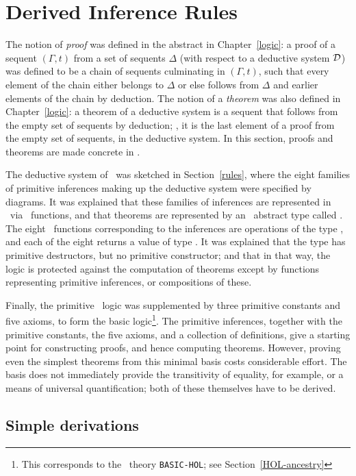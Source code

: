 \chapter{Derived Inference Rules}
\label{derived-rules}

The notion of {\it proof\/} was defined in the abstract in Chapter~\ref{logic}:
a proof of a sequent $(\Gamma,t)$ 
from a set of sequents $\Delta$ (with respect to a deductive system
${\cal D}$)
was defined to be a chain of sequents culminating in $(\Gamma,t)$, such
that every element of the chain either belongs to $\Delta$ or else
follows from $\Delta$ and earlier elements of the chain by 
deduction. 
The notion of a {\it theorem\/} was also defined in Chapter~\ref{logic}:
a theorem of a deductive system is a sequent that follows from the
empty set of sequents by deduction; \ie, it is the last element of a proof
from the empty set of sequents, in the deductive system.
In this section, proofs and theorems are made concrete in \HOL.

The deductive system of \HOL\
was sketched in Section~\ref{rules}, where
the eight families of primitive inferences making up the
deductive system were specified by diagrams. It was explained that
these families of inferences are represented in \HOL\ via
\ML\ functions, and that theorems
are represented by an \ML\ abstract type called .  
The eight \ML\ functions corresponding to the inferences
are operations of the type , and each of the eight
returns a value of type . It was explained that the
type \ml{thm} has primitive destructors, but no primitive
constructor; and that in that way, the logic is protected against
the computation of theorems except by functions representing
primitive inferences, or compositions of these.

Finally, the primitive \HOL\ logic was supplemented by three primitive
constants and five axioms, to form the basic logic\footnote{This
corresponds to the \HOL\ theory {\tt BASIC-HOL}; see
Section~\ref{HOL-ancestry}}.
The primitive inferences, together with the primitive constants,
the five axioms, and a collection of definitions,
give a starting point for constructing proofs,
and hence computing theorems. However, proving even the simplest
theorems from this minimal basis costs considerable effort. The
basis does not immediately provide the transitivity
of equality, for example, or a means of universal quantification;
both of these themselves have to be derived.  

\section{Simple derivations}

